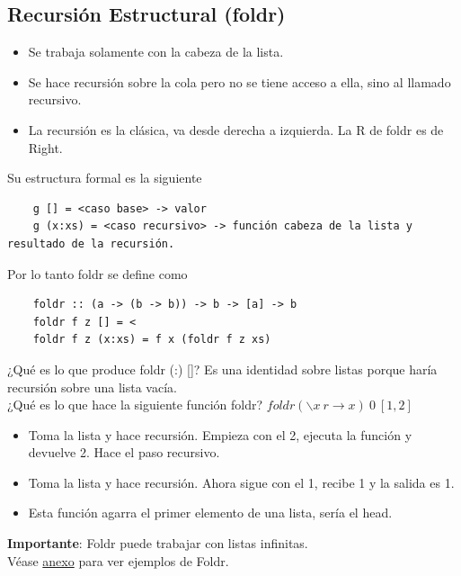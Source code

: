 \documentclass[10pt,a4paper]{article}
\begin{document}
\subsection*{Recursión Estructural (foldr)}
\begin{itemize}
    \item Se trabaja solamente con la cabeza de la lista.
    \item Se hace recursión sobre la cola pero no se tiene acceso a ella, sino al llamado recursivo. 
    \item La recursión es la clásica, va desde derecha a izquierda. La R de foldr es de Right. 
\end{itemize}
Su estructura formal es la siguiente 
\begin{lstlisting}
    g [] = <caso base> -> valor 
    g (x:xs) = <caso recursivo> -> función cabeza de la lista y resultado de la recursión.
\end{lstlisting}
Por lo tanto foldr se define como
\begin{lstlisting}
    foldr :: (a -> (b -> b)) -> b -> [a] -> b 
    foldr f z [] = <
    foldr f z (x:xs) = f x (foldr f z xs)
\end{lstlisting}
¿Qué es lo que produce foldr (:) []? Es una identidad sobre listas porque haría recursión sobre una lista vacía. \\
¿Qué es lo que hace la siguiente función foldr? $ foldr(\backslash x \ r \rightarrow x) \ 0 \ [1, 2]$ 
\begin{itemize}
    \item Toma la lista y hace recursión. Empieza con el 2, ejecuta la función y devuelve 2. Hace el paso recursivo.
    \item Toma la lista y hace recursión. Ahora sigue con el 1, recibe 1 y la salida es 1. 
    \item Esta función agarra el primer elemento de una lista, sería el head.
\end{itemize}
\textbf{Importante}: Foldr puede trabajar con listas infinitas. \\
Véase \hyperref[subsec:folder_ex]{anexo} para ver ejemplos de Foldr. 
\end{document}
